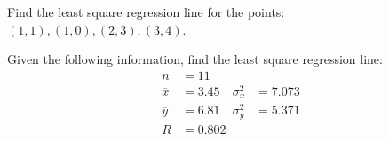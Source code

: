 \documentclass[11pt,letterpaper]{article}
\begin{document}

 Find the least square regression line for the points: $(1, 1), (1,0), (2,3), (3,4)$.


\newpage



 Given the following information, find the least square regression line:
	\[
	\begin{aligned}
	n&= 11 \\
	\overline{x}&= 3.45 \quad \sigma_x^2&= 7.073 \\
	\overline{y}&= 6.81 \quad \sigma_y^2&= 5.371 \\
	R&= 0.802
	\end{aligned}
	\]
\end{document}
